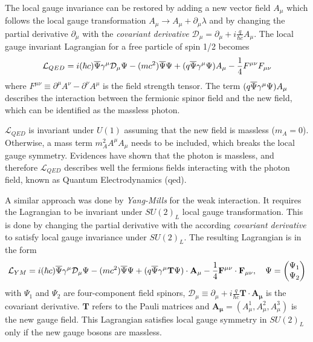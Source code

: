 The local gauge invariance can be restored by adding a new vector field $A_{\mu}$ which follows the local gauge transformation $A_{\mu} \rightarrow A_{\mu} + \partial_{\mu}\lambda$ and by changing the partial derivative $\partial_{\mu}$ with the \textit{covariant derivative} $\mathcal{D}_{\mu} = \partial_{\mu} + i\frac{q}{\hbar c}A_{\mu}$. The local gauge invariant Lagrangian for a free particle of spin 1/2 becomes \cite{Griffiths:343277}
\begin{equation}
  \mathcal{L}_{QED} = i(\hbar c)\overline{\rm \Psi}\gamma^{\mu}\mathcal{D}_{\mu}\Psi - (mc^2)\overline{\rm \Psi}\Psi + (q\overline{\rm \Psi}\gamma^{\mu}\Psi)A_{\mu} - \frac{1}{4}F^{\mu\nu}F_{\mu\nu}
\end{equation}
where $F^{\mu\nu} \equiv \partial^{\mu}A^{\nu} - \partial^{\nu}A^{\mu}$ is the field strength tensor. The term $(q\overline{\rm \Psi}\gamma^{\mu}\Psi)A_{\mu}$ describes the interaction between the fermionic spinor field and the new field, which can be identified as the massless photon.

$\mathcal{L}_{QED}$ is invariant under $U(1)$ assuming that the new field is massless ($m_{A} = 0$). Otherwise, a mass term $m_{A}^2A^{\mu}A_{\mu}$ needs to be included, which breaks the local gauge symmetry. Evidences \cite{Lakes:1998mi, Chibisov:1976mm, Williams:1971ms} have shown that the photon is massless, and therefore $\mathcal{L}_{QED}$ describes well the fermions fields interacting with the photon field, known as Quantum Electrodynamics (\acrshort{qed}).

A similar approach was done by \textit{Yang-Mills} for the weak interaction. It requires the Lagrangian to be invariant under $SU(2)_{L}$ local gauge transformation. This is done by changing the partial derivative with the according \textit{covariant derivative} to satisfy local gauge invariance under $SU(2)_{L}$. The resulting Lagrangian is in the form \cite{Griffiths:343277}
\begin{equation}
  \mathcal{L}_{YM} = i(\hbar c)\overline{\rm \Psi}\gamma^{\mu}\mathcal{D}_{\mu}\Psi - (mc^2)\overline{\rm \Psi}\Psi + (q\overline{\rm \Psi}\gamma^{\mu}\mathbf{T}\Psi) \cdot \mathbf{A_{\mu}} - \frac{1}{4}\mathbf{F^{\mu\nu}} \cdot \mathbf{F_{\mu\nu}}, \quad \Psi = \begin{pmatrix} \Psi_1 \\ \Psi_2 \end{pmatrix}
\end{equation}
with $\Psi_1$ and $\Psi_2$ are four-component field spinors, $\mathcal{D}_{\mu} \equiv \partial_{\mu} + i\frac{q}{\hbar c}\mathbf{T} \cdot \mathbf{A_{\mu}}$ is the covariant derivative. $\mathbf{T}$ refers to the Pauli matrices and $\mathbf{A_{\mu}} = (A_{\mu}^1, A_{\mu}^2, A_{\mu}^3)$ is the new gauge field. This Lagrangian satisfies local gauge symmetry in $SU(2)_{L}$ only if the new gauge bosons are massless.


